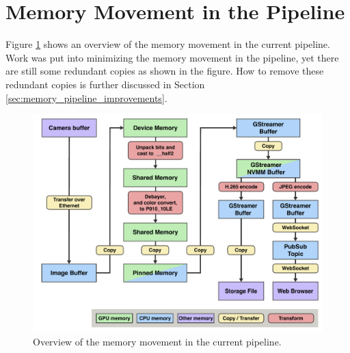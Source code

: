 \section{Memory Movement in the Pipeline}
Figure \ref{fig:pipeline_current} shows an overview of the memory movement in the current pipeline.
Work was put into minimizing the memory movement in the pipeline, yet there are still some redundant copies as shown in the figure.
How to remove these redundant copies is further discussed in Section \ref{sec:memory_pipeline_improvements}.

\begin{figure}[H]
    \centering
    \includegraphics[width=\textwidth]{figures/memory_pipeline/current.pdf}
    \caption{Overview of the memory movement in the current pipeline.}
    \label{fig:pipeline_current}
\end{figure}



